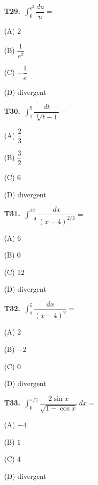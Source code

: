 \documentclass[11pt]{article}
\begin{document}
\bigskip\noindent\textbf{T29.}\ $\displaystyle\int_0^{e^2} \dfrac{du}{u} =$
\begin{list}{}{\setlength{\leftmargin}{3em}\setlength{\labelwidth}{2.5em}\setlength{\itemsep}{0pt}\setlength{\topsep}{2pt}}
\item[(A)] $2$
\item[(B)] $\dfrac{1}{e^2}$
\item[(C)] $-\dfrac{1}{e}$
\item[(D)] divergent
\end{list}

\bigskip\noindent\textbf{T30.}\ $\displaystyle\int_1^9 \dfrac{dt}{\sqrt[3]{t-1}} =$
\begin{list}{}{\setlength{\leftmargin}{3em}\setlength{\labelwidth}{2.5em}\setlength{\itemsep}{0pt}\setlength{\topsep}{2pt}}
\item[(A)] $\dfrac{2}{3}$
\item[(B)] $\dfrac{3}{2}$
\item[(C)] $6$
\item[(D)] divergent
\end{list}

\bigskip\noindent\textbf{T31.}\ $\displaystyle\int_{-4}^{12} \dfrac{dx}{(x-4)^{2/3}} =$
\begin{list}{}{\setlength{\leftmargin}{3em}\setlength{\labelwidth}{2.5em}\setlength{\itemsep}{0pt}\setlength{\topsep}{2pt}}
\item[(A)] $6$
\item[(B)] $0$
\item[(C)] $12$
\item[(D)] divergent
\end{list}

\bigskip\noindent\textbf{T32.}\ $\displaystyle\int_2^5 \dfrac{dx}{(x-4)^2} =$
\begin{list}{}{\setlength{\leftmargin}{3em}\setlength{\labelwidth}{2.5em}\setlength{\itemsep}{0pt}\setlength{\topsep}{2pt}}
\item[(A)] $2$
\item[(B)] $-2$
\item[(C)] $0$
\item[(D)] divergent
\end{list}

\bigskip\noindent\textbf{T33.}\ $\displaystyle\int_0^{\pi/2} \dfrac{2\sin x}{\sqrt{1-\cos x}}\,dx =$
\begin{list}{}{\setlength{\leftmargin}{3em}\setlength{\labelwidth}{2.5em}\setlength{\itemsep}{0pt}\setlength{\topsep}{2pt}}
\item[(A)] $-4$
\item[(B)] $1$
\item[(C)] $4$
\item[(D)] divergent
\end{list}
\end{document}
